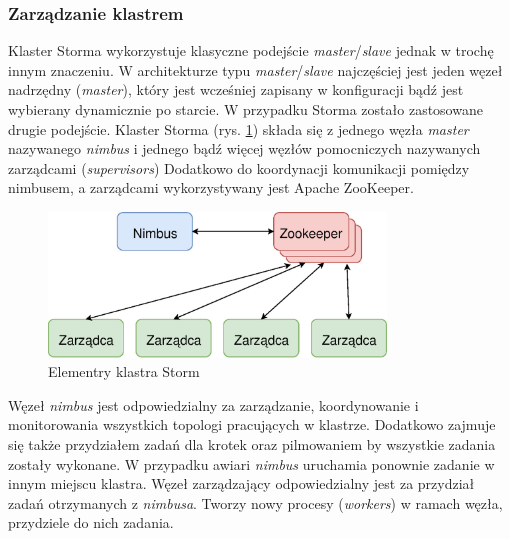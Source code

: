 \subsubsection*{Zarządzanie klastrem}
Klaster Storma wykorzystuje klasyczne podejście \textit{master}/\textit{slave}
jednak w trochę innym znaczeniu.
W architekturze typu \textit{master}/\textit{slave} najczęściej jest jeden węzeł nadrzędny (\textit{master}),
który jest wcześniej zapisany w konfiguracji
bądź jest wybierany dynamicznie po starcie.
W przypadku Storma zostało zastosowane drugie podejście.
Klaster Storma (rys. \ref{fig:StormCluster}) składa się z jednego węzła \textit{master} nazywanego \textit{nimbus}
i jednego bądź więcej węzłów pomocniczych nazywanych zarządcami (\textit{supervisors})
Dodatkowo do koordynacji komunikacji pomiędzy nimbusem,
a zarządcami wykorzystywany jest Apache ZooKeeper.
\begin{figure}[htbp]
  \centering
  \includegraphics[width=0.8\textwidth]{img/stormCluster}
  \caption{Elementry klastra Storm}
  \label{fig:StormCluster}
\end{figure}

Węzeł \textit{nimbus} jest odpowiedzialny za zarządzanie,
koordynowanie i monitorowania wszystkich topologi pracujących w klastrze.
Dodatkowo zajmuje się także przydziałem zadań dla krotek
oraz pilmowaniem by wszystkie zadania zostały wykonane.
W przypadku awiari \textit{nimbus} uruchamia ponownie zadanie w innym miejscu klastra.
Węzeł zarządzający odpowiedzialny jest za przydział zadań otrzymanych z \textit{nimbusa}.
Tworzy nowy procesy (\textit{workers}) w ramach węzła,
przydziele do nich zadania.
